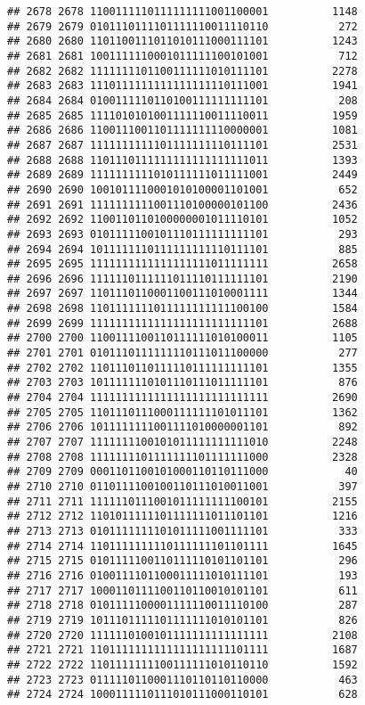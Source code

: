 \documentclass[]{article}
\begin{document}
\begin{verbatim}
## 2678 2678 1100111110111111111001100001          1148
## 2679 2679 0101110111101111110011110110           272
## 2680 2680 1101100111011010111000111101          1243
## 2681 2681 1001111110001011111100101001           712
## 2682 2682 1111111101100111111010111101          2278
## 2683 2683 1110111111111111111110111001          1941
## 2684 2684 0100111110110100111111111101           208
## 2685 2685 1111010101001111110011110011          1959
## 2686 2686 1100111001101111111110000001          1081
## 2687 2687 1111111111101111111110111101          2531
## 2688 2688 1101110111111111111111111011          1393
## 2689 2689 1111111111010111111011111001          2449
## 2690 2690 1001011110001010100001101001           652
## 2691 2691 1111111111001110100000101100          2436
## 2692 2692 1100110110100000001011110101          1052
## 2693 2693 0101111100101110111111111101           293
## 2694 2694 1011111110111111111110111101           885
## 2695 2695 1111111111111111111011111111          2658
## 2696 2696 1111110111111011110111111101          2190
## 2697 2697 1101110110001100111010001111          1344
## 2698 2698 1101111111011111111111100100          1584
## 2699 2699 1111111111111111111111111101          2688
## 2700 2700 1100111100110111111010100011          1105
## 2701 2701 0101110111111110111011100000           277
## 2702 2702 1101110110111110111111111101          1355
## 2703 2703 1011111110101110111011111101           876
## 2704 2704 1111111111111111111111111111          2690
## 2705 2705 1101110111000111111101011101          1362
## 2706 2706 1011111111001111010000001101           892
## 2707 2707 1111111100101011111111111010          2248
## 2708 2708 1111111101111111101111111000          2328
## 2709 2709 0001101100101000110110111000            40
## 2710 2710 0110111100100110111010011001           397
## 2711 2711 1111110111001011111111100101          2155
## 2712 2712 1101011111101111111011101101          1216
## 2713 2713 0101111111101011111001111101           333
## 2714 2714 1101111111110111111101101111          1645
## 2715 2715 0101111100110111110101101101           296
## 2716 2716 0100111101100011111010111101           193
## 2717 2717 1000110111100110110010101101           611
## 2718 2718 0101111100001111110011110100           287
## 2719 2719 1011101111101111111010101101           826
## 2720 2720 1111110100101111111111111111          2108
## 2721 2721 1101111111111111111111101111          1687
## 2722 2722 1101111111100111111010110110          1592
## 2723 2723 0111110110001110110110110000           463
## 2724 2724 1000111110111010111000110101           628

\end{verbatim}
\end{document}
